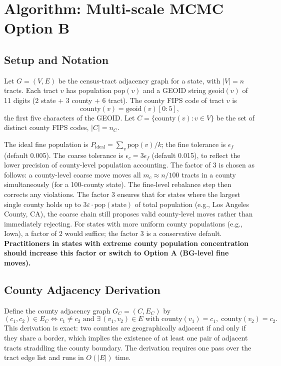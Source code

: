 \section{Algorithm: Multi-scale MCMC Option B}
\label{sec:algorithm}

\subsection{Setup and Notation}

Let $G = (V, E)$ be the census-tract adjacency graph for a state, with
$|V| = n$ tracts.
Each tract $v$ has population $\mathrm{pop}(v)$ and a GEOID string
$\mathrm{geoid}(v)$ of 11 digits (2 state + 3 county + 6 tract).
The county FIPS code of tract $v$ is
\[
  \mathrm{county}(v) = \mathrm{geoid}(v)[0{:}5],
\]
the first five characters of the GEOID.
Let $C = \{\mathrm{county}(v) : v \in V\}$ be the set of distinct county
FIPS codes, $|C| = n_C$.

The ideal fine population is $P_{\mathrm{ideal}} = \sum_v \mathrm{pop}(v) / k$;
the fine tolerance is $\epsilon_f$ (default 0.005).
The coarse tolerance is $\epsilon_c = 3 \epsilon_f$ (default 0.015), to
reflect the lower precision of county-level population accounting.
The factor of 3 is chosen as follows: a county-level coarse move moves all $m_c \approx n/100$ tracts in a county simultaneously (for a 100-county state). The fine-level rebalance step then corrects any violations. The factor 3 ensures that for states where the largest single county holds up to $3\varepsilon \cdot \text{pop}(\text{state})$ of total population (e.g., Los Angeles County, CA), the coarse chain still proposes valid county-level moves rather than immediately rejecting. For states with more uniform county populations (e.g., Iowa), a factor of 2 would suffice; the factor 3 is a conservative default. \textbf{Practitioners in states with extreme county population concentration should increase this factor or switch to Option A (BG-level fine moves).}

\subsection{County Adjacency Derivation}

\begin{proposition}
\label{prop:county-adj-exact}
Define the county adjacency graph $G_C = (C, E_C)$ by
\[
  (c_1, c_2) \in E_C
  \iff c_1 \neq c_2
  \text{ and }
  \exists\, (v_1, v_2) \in E \text{ with }
  \mathrm{county}(v_1) = c_1,\;
  \mathrm{county}(v_2) = c_2.
\]
This derivation is exact: two counties are geographically adjacent if and
only if they share a border, which implies the existence of at least one
pair of adjacent tracts straddling the county boundary.
The derivation requires one pass over the tract edge list and runs in $O(|E|)$
time.
\end{proposition}

